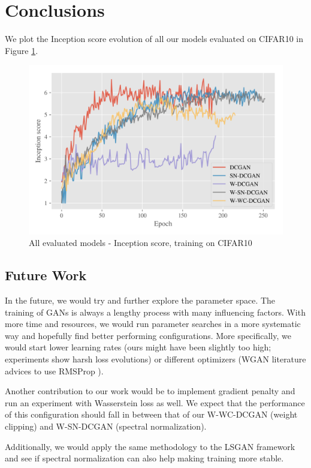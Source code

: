 
\section{Conclusions}

We plot the Inception score evolution of all our models evaluated on CIFAR10 in Figure \ref{fig:exp-all-is}.
\begin{figure}[h]
\centering
\includegraphics[width=\textwidth]{../code/results/figures/all_cifar10_is.png}
\caption{All evaluated models - Inception score, training on CIFAR10}
\label{fig:exp-all-is}
\end{figure}




\subsection{Future Work}
In the future, we would try and further explore the parameter space. The training of GANs is always a lengthy process with many influencing factors. With more time and resources, we would run parameter searches in a more systematic way and hopefully find better performing configurations. More specifically, we would start lower learning rates (ours might have been slightly too high; experiments show harsh loss evolutions) or different optimizers (WGAN literature advices to use RMSProp \cite{arjovsky2017wasserstein}).

Another contribution to our work would be to implement gradient penalty and run an experiment with Wasserstein loss as well. We expect that the performance of this configuration should fall in between that of our W-WC-DCGAN (weight clipping) and W-SN-DCGAN (spectral normalization).

Additionally, we would apply the same methodology to the LSGAN framework \cite{mao2017least} and see if spectral normalization can also help making training more stable. 
